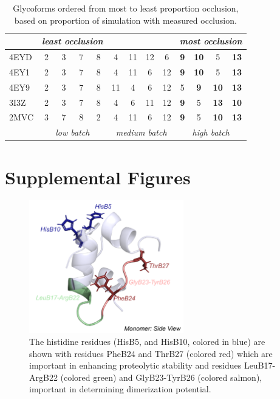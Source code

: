 \documentclass[9pt]{elife}
\begin{document}
\renewcommand{\thetable}{S\arabic{table}}
\begin{table}[ht]
\centering
\begin{tabular} {|l| c c c c c c c c c c c c|}
    \hline
     & \multicolumn{4}{c}{\textit{least occlusion}} &&& & & \multicolumn{4}{c|}{\textit{most occlusion}}\\
    \hline     
    4EYD&2&3&7&8&4&11&12&6&\textbf{9}&\textbf{10}&5&\textbf{13}\\
    4EY1&2&3&7&8&4&11&6&12&\textbf{9}&\textbf{10}&5&\textbf{13}\\
    4EY9&2&3&7&8&11&4&6&12&5&\textbf{9}&\textbf{10}&\textbf{13}\\
    3I3Z&2&3&7&8&4&6&11&12&\textbf{9}&5&\textbf{13}&\textbf{10}\\
    2MVC&3&7&8&2&4&11&6&12&\textbf{9}&5&\textbf{10}&\textbf{13}\\
    \hline
    & \multicolumn{4}{c|}{\textit{low batch}} & \multicolumn{4}{c|}{\textit{medium batch}} & \multicolumn{4}{c|}{\textit{high batch}}\\
    \hline
\end{tabular}
\caption{Glycoforms ordered from most to least proportion occlusion, based on proportion of simulation with measured occlusion.}
\label{supple_tab: occlusion_tab}
\end{table}

\section{Supplemental Figures}
\renewcommand{\thefigure}{S\arabic{figure}}
\setcounter{figure}{0}  
\begin{figure}[H]
\centering
\includegraphics[width=0.6\textwidth]{Figures/Fig_histidine_WT.png}
\caption{The histidine residues (HisB5, and HisB10, colored in blue) are shown with residues PheB24 and ThrB27 (colored red) which are important in enhancing proteolytic stability and residues LeuB17-ArgB22 (colored green) and GlyB23-TyrB26 (colored salmon), important in determining dimerization potential.}
\label{supple_fig: WT_hist}
\end{figure}
\end{document}
